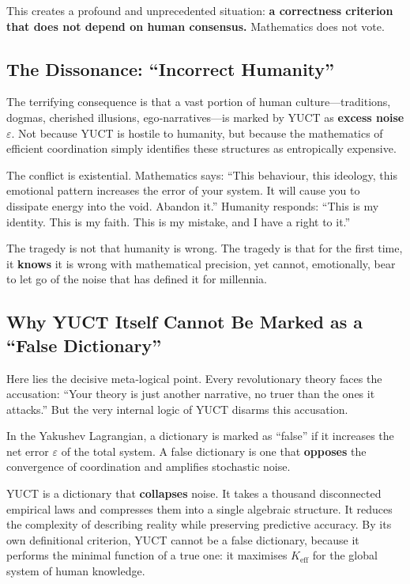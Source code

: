 \documentclass[12pt,a4paper]{article}
\begin{document}
	This creates a profound and unprecedented situation: \textbf{a correctness criterion that does not depend on human consensus.} Mathematics does not vote.
	
	\subsection{The Dissonance: ``Incorrect Humanity''}
	
	The terrifying consequence is that a vast portion of human culture---traditions, dogmas, cherished illusions, ego‑narratives---is marked by YUCT as \textbf{excess noise \(\varepsilon\)}. Not because YUCT is hostile to humanity, but because the mathematics of efficient coordination simply identifies these structures as entropically expensive.
	
	The conflict is existential. Mathematics says: ``This behaviour, this ideology, this emotional pattern increases the error of your system. It will cause you to dissipate energy into the void. Abandon it.'' Humanity responds: ``This is my identity. This is my faith. This is my mistake, and I have a right to it.''
	
	The tragedy is not that humanity is wrong. The tragedy is that for the first time, it \textbf{knows} it is wrong with mathematical precision, yet cannot, emotionally, bear to let go of the noise that has defined it for millennia.
	
	\subsection{Why YUCT Itself Cannot Be Marked as a ``False Dictionary''}
	
	Here lies the decisive meta‑logical point. Every revolutionary theory faces the accusation: ``Your theory is just another narrative, no truer than the ones it attacks.'' But the very internal logic of YUCT disarms this accusation.
	
	In the Yakushev Lagrangian, a dictionary is marked as ``false'' if it increases the net error \(\varepsilon\) of the total system. A false dictionary is one that \textbf{opposes} the convergence of coordination and amplifies stochastic noise.
	
	YUCT is a dictionary that \textbf{collapses} noise. It takes a thousand disconnected empirical laws and compresses them into a single algebraic structure. It reduces the complexity of describing reality while preserving predictive accuracy. By its own definitional criterion, YUCT cannot be a false dictionary, because it performs the minimal function of a true one: it maximises \(K_{\mathrm{eff}}\) for the global system of human knowledge.
	
\end{document}
